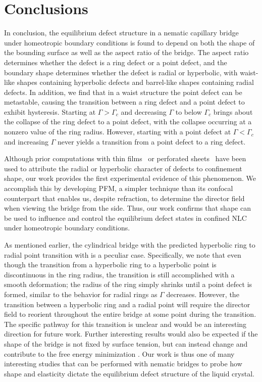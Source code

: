 \section{Conclusions}
In conclusion, the equilibrium defect structure in a nematic capillary bridge under homeotropic boundary conditions is found to depend on both the shape of the bounding surface as well as the aspect ratio of the bridge.
The aspect ratio determines whether the defect is a ring defect or a point defect, and the boundary shape determines whether the defect is radial or hyperbolic, with waist-like shapes containing hyperbolic defects and barrel-like shapes containing radial defects.
In addition, we find that in a waist structure the point defect can be metastable,  causing the transition between a ring defect and a point defect to exhibit hysteresis.
Starting at $\Gamma > \Gamma_c$ and decreasing $\Gamma$ to below $\Gamma_c$ brings about the collapse of the ring defect to a point defect, with the collapse occurring at a nonzero value of the ring radius.
However, starting with a point defect at $\Gamma < \Gamma_c$ and increasing $\Gamma$ never yields a transition from a point defect to a ring defect.

Although prior computations with thin films~\cite{RN141} or perforated sheets~\cite{RN149} have been used to attribute the radial or hyperbolic character of defects to confinement shape, our work provides the first experimental evidence of this phenomenon.
We accomplish this by developing PFM, a simpler technique than its confocal counterpart that enables us, despite refraction, to determine the director field when viewing the bridge from the side.
Thus, our work confirms that shape can be used to influence and control the equilibrium defect states in confined NLC under homeotropic boundary conditions.

As mentioned earlier, the cylindrical bridge with the predicted hyperbolic ring to radial point transition with is a peculiar case.
Specifically, we note that even though the transition from a hyperbolic ring to a hyperbolic point is discontinuous in the ring radius, the transition is still accomplished with a smooth deformation; the radius of the ring simply shrinks until a point defect is formed, similar to the behavior for radial rings as $\Gamma$ decreases.
However, the transition between a hyperbolic ring and a radial point will require the director field to reorient throughout the entire bridge at some point during the transition.
The specific pathway for this transition is unclear and would be an interesting direction for future work.
Further interesting results would also be expected if the shape of the bridge is not fixed by surface tension, but can instead change and contribute to the free energy minimization \cite{RN12}.
Our work is thus one of many interesting studies that can be performed with nematic bridges to probe how shape and elasticity dictate the equilibrium defect structure of the liquid crystal.

